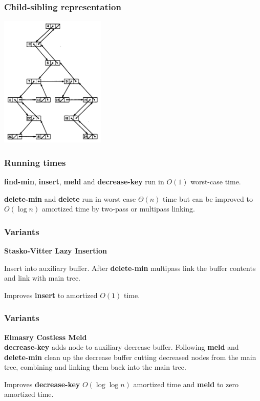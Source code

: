 \documentclass{beamer}
\begin{document}
\begin{frame}
\frametitle{Child-sibling representation}
\includegraphics[width=5cm]{../pairing-heap-slides/fig3.png}

\end{frame}

\begin{frame}
\frametitle{Running times}

\textbf{find-min}, \textbf{insert}, \textbf{meld} and \textbf{decrease-key} 
run in $O(1)$ worst-case time.

\textbf{delete-min} and \textbf{delete} run in worst case $\Theta(n)$ time but
can be improved to $O(\log n)$ amortized time by two-pass or multipass linking.

\end{frame}

\begin{frame}
\frametitle{Variants}

\textbf{Stasko-Vitter Lazy Insertion}

Insert into auxiliary buffer. After \textbf{delete-min} multipass link the
buffer contents and link with main tree.

Improves \textbf{insert} to amortized $O(1)$ time.

\end{frame}

\begin{frame}
\frametitle{Variants}

\textbf{Elmasry Costless Meld}\\

\textbf{decrease-key} adds node to auxiliary decrease buffer. Following
\textbf{meld} and \textbf{delete-min} clean up the decrease buffer cutting
decreased nodes from the main tree, combining and linking them back into the
main tree.

Improves \textbf{decrease-key} $O(\log \log n)$ amortized time and \textbf{meld}
to zero amortized time.

\end{frame}
\end{document}
